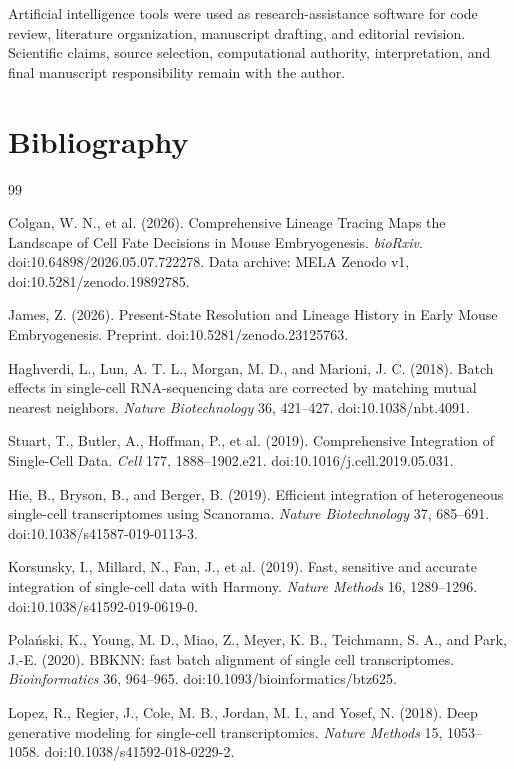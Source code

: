 \documentclass[11pt]{article}
\begin{document}
Artificial intelligence tools were used as research-assistance software for code review, literature organization, manuscript drafting, and editorial revision. Scientific claims, source selection, computational authority, interpretation, and final manuscript responsibility remain with the author.

\section{Bibliography}

\begin{thebibliography}{99}

Colgan, W. N., et al. (2026).
Comprehensive Lineage Tracing Maps the Landscape of Cell Fate Decisions in Mouse Embryogenesis.
\emph{bioRxiv}.
doi:10.64898/2026.05.07.722278.
Data archive: MELA Zenodo v1, doi:10.5281/zenodo.19892785.

James, Z. (2026).
Present-State Resolution and Lineage History in Early Mouse Embryogenesis.
Preprint.
doi:10.5281/zenodo.23125763.

Haghverdi, L., Lun, A. T. L., Morgan, M. D., and Marioni, J. C. (2018).
Batch effects in single-cell RNA-sequencing data are corrected by matching mutual nearest neighbors.
\emph{Nature Biotechnology} 36, 421--427.
doi:10.1038/nbt.4091.

Stuart, T., Butler, A., Hoffman, P., et al. (2019).
Comprehensive Integration of Single-Cell Data.
\emph{Cell} 177, 1888--1902.e21.
doi:10.1016/j.cell.2019.05.031.

Hie, B., Bryson, B., and Berger, B. (2019).
Efficient integration of heterogeneous single-cell transcriptomes using Scanorama.
\emph{Nature Biotechnology} 37, 685--691.
doi:10.1038/s41587-019-0113-3.

Korsunsky, I., Millard, N., Fan, J., et al. (2019).
Fast, sensitive and accurate integration of single-cell data with Harmony.
\emph{Nature Methods} 16, 1289--1296.
doi:10.1038/s41592-019-0619-0.

Pola\'nski, K., Young, M. D., Miao, Z., Meyer, K. B., Teichmann, S. A., and Park, J.-E. (2020).
BBKNN: fast batch alignment of single cell transcriptomes.
\emph{Bioinformatics} 36, 964--965.
doi:10.1093/bioinformatics/btz625.

Lopez, R., Regier, J., Cole, M. B., Jordan, M. I., and Yosef, N. (2018).
Deep generative modeling for single-cell transcriptomics.
\emph{Nature Methods} 15, 1053--1058.
doi:10.1038/s41592-018-0229-2.


\end{thebibliography}
\end{document}
